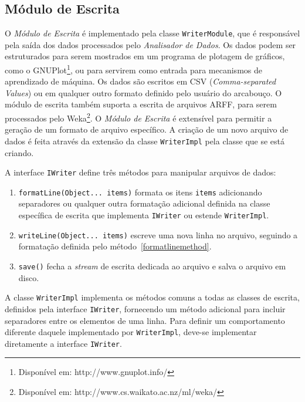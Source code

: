 \subsection{Módulo de Escrita}

O \emph{Módulo de Escrita} é implementado pela classe \texttt{WriterModule}, que é responsável pela saída dos dados processados pelo \emph{Analisador de Dados}. Os dados podem ser estruturados para serem mostrados em um programa de plotagem de gráficos, como o GNUPlot\footnote{Disponível em: http://www.gnuplot.info/}, ou para servirem como entrada para mecanismos de aprendizado de máquina. Os dados são escritos em CSV (\textit{Comma-separated Values}) ou em qualquer outro formato definido pelo usuário do arcabouço. O módulo de escrita também suporta a escrita de arquivos ARFF, para serem processados pelo Weka\footnote{Disponível em: http://www.cs.waikato.ac.nz/ml/weka/}. O \emph{Módulo de Escrita} é extensível para permitir a geração de um formato de arquivo específico. A criação de um novo arquivo de dados é feita através da extensão da classe \texttt{WriterImpl} pela classe que se está criando.

A interface \texttt{IWriter} define três métodos para manipular arquivos de dados:

\begin{enumerate}
	\item \label{formatlinemethod} \texttt{formatLine(Object... items)} formata os itens \texttt{items} adicionando separadores ou qualquer outra formatação adicional definida na classe específica de escrita que implementa \texttt{IWriter} ou estende \texttt{WriterImpl}.
	\item \texttt{writeLine(Object... items)} escreve uma nova linha no arquivo, seguindo a formatação definida pelo método~\ref{formatlinemethod}.
	\item \texttt{save()} fecha a \textit{stream} de escrita dedicada ao arquivo e salva o arquivo em disco.
\end{enumerate}

A classe \texttt{WriterImpl} implementa os métodos comuns a todas as classes de escrita, definidos pela interface \texttt{IWriter}, fornecendo um método adicional para incluir separadores entre os elementos de uma linha. Para definir um comportamento diferente daquele implementado por \texttt{WriterImpl}, deve-se implementar diretamente a interface \texttt{IWriter}.





